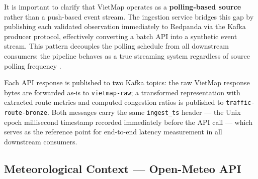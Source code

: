   It is important to clarify that VietMap operates as a \textbf{polling-based                                                                             
  source} rather than a push-based event stream. The ingestion service
  bridges this gap by publishing each validated observation immediately to                                                                                
  Redpanda via the Kafka producer protocol, effectively converting a                                                                                      
  batch API into a synthetic event stream. This pattern decouples the                                                                                     
  polling schedule from all downstream consumers: the pipeline behaves                                                                                    
  as a true streaming system regardless of source polling frequency                                                                                       
  \cite{kleppmann_ddia}.                                                                                                                                  
                                                                                                                                                          
  Each API response is published to two Kafka topics: the raw VietMap                                                   
  response bytes are forwarded as-is to \texttt{vietmap-raw}; a                                                         
  transformed representation with extracted route metrics and computed                                                  
  congestion ratios is published to \texttt{traffic-route-bronze}.                                                      
  Both messages carry the same \texttt{ingest\_ts} header --- the Unix                                                  
  epoch millisecond timestamp recorded immediately before the API call ---                                              
  which serves as the reference point for end-to-end latency measurement                                                
  in all downstream consumers.                                                                                                 
                                                                                                                                                          
  \subsection{Meteorological Context — Open-Meteo API}                                                                                                    
  \label{subsec:openmeteo}
   

